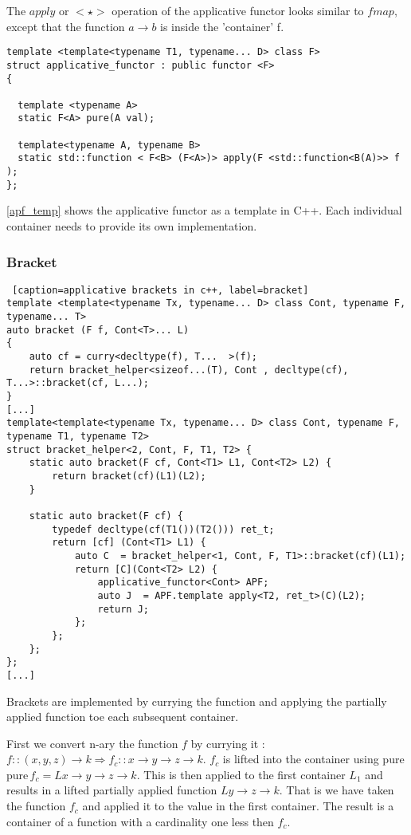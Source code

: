 \documentclass[12pt,fleqn]{article}
\begin{document}
The $apply$ or $<\star>$ operation of the applicative functor looks similar to $fmap$, except that the function $a \rightarrow b$ is inside the 'container' f.

\begin{lstlisting}[caption=applicative functor template in C++, label=apf_temp]
template <template<typename T1, typename... D> class F> 
struct applicative_functor : public functor <F>
{

  template <typename A> 
  static F<A> pure(A val);

  template<typename A, typename B>
  static std::function < F<B> (F<A>)> apply(F <std::function<B(A)>> f );
};
\end{lstlisting}

\ref{apf_temp} shows the applicative functor as a template in C++. 
Each individual container needs to provide its own implementation. 
%
%
%

%
%
%
\subsubsection{Bracket}
%
%
\begin {lstlisting} [caption=applicative brackets in c++, label=bracket]
template <template<typename Tx, typename... D> class Cont, typename F, typename... T> 
auto bracket (F f, Cont<T>... L) 
{
	auto cf = curry<decltype(f), T...  >(f);	
	return bracket_helper<sizeof...(T), Cont , decltype(cf), T...>::bracket(cf, L...);
} 
[...]
template<template<typename Tx, typename... D> class Cont, typename F, typename T1, typename T2>
struct bracket_helper<2, Cont, F, T1, T2> {
	static auto bracket(F cf, Cont<T1> L1, Cont<T2> L2) {
		return bracket(cf)(L1)(L2);
	}

	static auto bracket(F cf) {
		typedef decltype(cf(T1())(T2())) ret_t;
		return [cf] (Cont<T1> L1) {
			auto C  = bracket_helper<1, Cont, F, T1>::bracket(cf)(L1);
			return [C](Cont<T2> L2) { 
				applicative_functor<Cont> APF;
				auto J  = APF.template apply<T2, ret_t>(C)(L2);
				return J;
			};
		};
	};
};
[...]
\end{lstlisting}
Brackets are implemented by currying the function and applying the partially applied function toe each subsequent container.

First we convert n-ary the function $f$ by currying it : $f::(x,y,z) \rightarrow k \Rightarrow f_c::x \rightarrow y \rightarrow z \rightarrow k$. 
$f_c$ is lifted into the container using pure $ \mbox{pure} \, f_c = L x \rightarrow y \rightarrow z \rightarrow k$. 
This is  then applied to the first container $L_1$ and results in a lifted partially applied function $L y \rightarrow z \rightarrow k$. 
That is we have taken the function $f_c$ and applied it to the value in the first container. The result is a container of a function 
with a cardinality one less then $f_c$.
\end{document}
